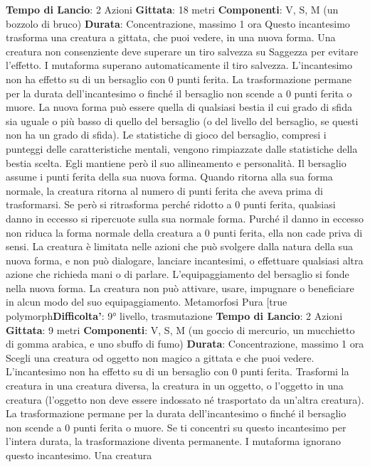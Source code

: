 \begin{multicols}{2}
\textbf{Tempo di Lancio}: 2 Azioni
\textbf{Gittata}: 18 metri
\textbf{Componenti}: V, S, M (un bozzolo di bruco)
\textbf{Durata}: Concentrazione, massimo 1 ora
Questo incantesimo trasforma una creatura a gittata,
che puoi vedere, in una nuova forma. Una creatura non
consenziente deve superare un tiro salvezza su
Saggezza per evitare l’effetto. I mutaforma superano
automaticamente il tiro salvezza. L’incantesimo non ha
effetto su di un bersaglio con 0 punti ferita.
La trasformazione permane per la durata
dell’incantesimo o finché il bersaglio non scende a 0
punti ferita o muore. La nuova forma può essere quella
di qualsiasi bestia il cui grado di sfida sia uguale o più
basso di quello del bersaglio (o del livello del bersaglio,
se questi non ha un grado di sfida). Le statistiche di
gioco del bersaglio, compresi i punteggi delle
caratteristiche mentali, vengono rimpiazzate dalle 
statistiche della bestia scelta. Egli mantiene però il suo
allineamento e personalità.
Il bersaglio assume i punti ferita della sua nuova forma.
Quando ritorna alla sua forma normale, la creatura
ritorna al numero di punti ferita che aveva prima di
trasformarsi. Se però si ritrasforma perché ridotto a 0
punti ferita, qualsiasi danno in eccesso si ripercuote
sulla sua normale forma. Purché il danno in eccesso
non riduca la forma normale della creatura a 0 punti
ferita, ella non cade priva di sensi.
La creatura è limitata nelle azioni che può svolgere
dalla natura della sua nuova forma, e non può
dialogare, lanciare incantesimi, o effettuare qualsiasi
altra azione che richieda mani o di parlare.
L’equipaggiamento del bersaglio si fonde nella nuova
forma. La creatura non può attivare, usare, impugnare o
beneficiare in alcun modo del suo equipaggiamento.
Metamorfosi Pura
[true polymorph\textbf{Difficolta'}:
9° livello, trasmutazione
\textbf{Tempo di Lancio}: 2 Azioni
\textbf{Gittata}: 9 metri
\textbf{Componenti}: V, S, M (un goccio di mercurio, un
mucchietto di gomma arabica, e uno sbuffo di fumo)
\textbf{Durata}: Concentrazione, massimo 1 ora
Scegli una creatura od oggetto non magico a gittata e
che puoi vedere. L’incantesimo non ha effetto su di un
bersaglio con 0 punti ferita. Trasformi la creatura in una
creatura diversa, la creatura in un oggetto, o l’oggetto in
una creatura (l’oggetto non deve essere indossato né
trasportato da un’altra creatura). La trasformazione
permane per la durata dell’incantesimo o finché il
bersaglio non scende a 0 punti ferita o muore. Se ti
concentri su questo incantesimo per l’intera durata, la
trasformazione diventa permanente.
I mutaforma ignorano questo incantesimo. Una creatura

\end{multicols}
